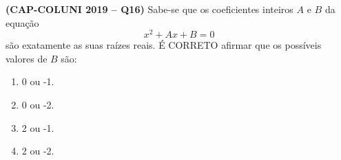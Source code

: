 \textbf{(CAP-COLUNI 2019 -- Q16)} Sabe-se que os coeficientes inteiros $A$ e $B$ da equação
\[
x^2+Ax+B=0
\]
são exatamente as suas raízes reais. É CORRETO afirmar que os possíveis valores de $B$ são:

\begin{enumerate}
	\item 0 ou -1.
	\item 0 ou -2.
	\item 2 ou -1.
	\item 2 ou -2.
\end{enumerate}
